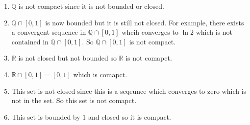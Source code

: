 \begin{enumerate}[label=(\alph*)]
    \item $\mathbb{Q}$ is not compact since it is not bounded or closed.
    \item $\mathbb{Q}\cap[0,1]$ is now bounded but it is still not closed. For
    example,
    there exists a convergent sequence in $\mathbb{Q}\cap[0,1]$ whcih converges to 
    $\ln 2$ which is not contained in $\mathbb{Q}\cap[0,1]$. So $\mathbb{Q}\cap[0,1]$
    is not compact.

    \item $\mathbb{R}$ is not closed but not bounded so $\mathbb{R}$ is not comapct.
    
    \item $\mathbb{R}\cap[0,1]=[0,1]$ which is comapct.
    \item This set is not closed since this is a seqeunce which converges to zero
    which is not in the set. So this set is not comapct.
    \item This set is bounded by $1$ and closed so it is compact.
    
\end{enumerate}

